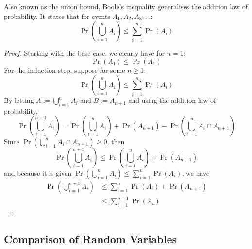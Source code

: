 \documentclass[11pt]{report} %
\begin{document}
Also known as the union bound, Boole's inequality generalises the addition law of probability. It states that for events $A_{1}, A_{2}, A_{3}, \dots$:
\begin{equation}
\operatorname{Pr}\left(\bigcup_{i = 1}^{n}A_{i}\right) \leq \sum_{i = 1}^{n}\operatorname{Pr}\left(A_{i}\right)
\end{equation}
\begin{proof}
Starting with the base case, we clearly have for $n = 1$:
\begin{equation}
\operatorname{Pr}\left(A_{1}\right) \leq \operatorname{Pr}\left(A_{1}\right)
\end{equation}
For the induction step, suppose for some $n \geq 1$:
\begin{equation}
\operatorname{Pr}\left(\bigcup_{i = 1}^{n}A_{i}\right) \leq \sum_{i = 1}^{n}\operatorname{Pr}\left(A_{i}\right)
\end{equation}
By letting $A := \bigcup_{i = 1}^{n}A_{i}$ and $B := A_{n + 1}$ and using the addition law of probability,
\begin{equation}
\operatorname{Pr}\left(\bigcup_{i = 1}^{n + 1}A_{i}\right) = \operatorname{Pr}\left(\bigcup_{i = 1}^{n}A_{i}\right) + \operatorname{Pr}\left(A_{n + 1}\right) -  \operatorname{Pr}\left(\bigcup_{i = 1}^{n}A_{i} \cap A_{n + 1}\right)
\end{equation}
Since $\operatorname{Pr}\left(\bigcup_{i = 1}^{n}A_{i} \cap A_{n + 1}\right) \geq 0$, then
\begin{equation}
\operatorname{Pr}\left(\bigcup_{i = 1}^{n + 1}A_{i}\right) \leq \operatorname{Pr}\left(\bigcup_{i = 1}^{n}A_{i}\right) + \operatorname{Pr}\left(A_{n + 1}\right)
\end{equation}
and because it is given $\operatorname{Pr}\left(\bigcup_{i = 1}^{n}A_{i}\right) \leq \sum_{i = 1}^{n}\operatorname{Pr}\left(A_{i}\right)$, we have
\begin{align}
\operatorname{Pr}\left(\bigcup_{i = 1}^{n + 1}A_{i}\right) &\leq \sum_{i = 1}^{n}\operatorname{Pr}\left(A_{i}\right) + \operatorname{Pr}\left(A_{n + 1}\right) \\
&\leq \sum_{i = 1}^{n + 1}\operatorname{Pr}\left(A_{i}\right)
\end{align}
\end{proof}

\subsection{Comparison of Random Variables}
\end{document}
